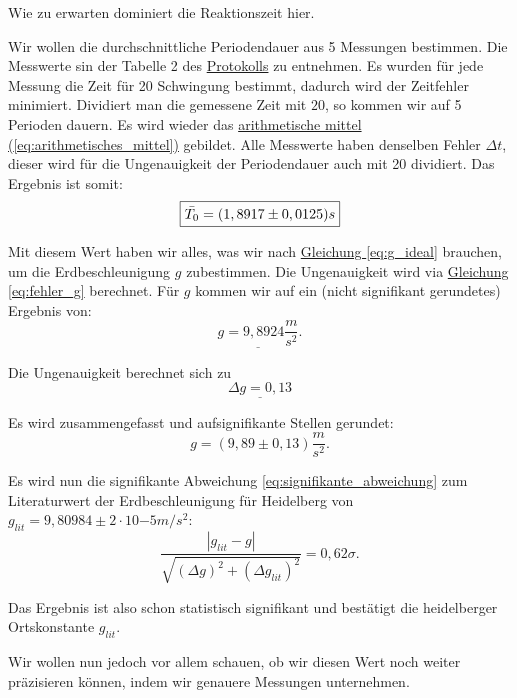 Wie zu erwarten dominiert die Reaktionszeit hier.

Wir wollen die durchschnittliche Periodendauer aus 5 Messungen bestimmen. Die Messwerte sin der Tabelle 2 des \hyperref[Protokoll]{Protokolls} zu entnehmen. Es wurden für jede Messung die Zeit für 20 Schwingung bestimmt, dadurch wird der Zeitfehler minimiert. Dividiert man die gemessene Zeit mit $20$, so kommen wir auf 5 Perioden dauern. Es wird wieder das \hyperref[eq:arithmetisches_mittel]{arithmetische mittel (\ref*{eq:arithmetisches_mittel})} gebildet. Alle Messwerte haben denselben Fehler $\Delta t$, dieser wird für die Ungenauigkeit der Periodendauer auch mit 20 dividiert. Das Ergebnis ist somit:
\begin{equation}
    \boxed{
        \Bar{T_0} = (1,8917 \pm 0,0125)s
    }
\end{equation}

Mit diesem Wert haben wir alles, was wir nach \hyperref[eq:g_ideal]{Gleichung \ref*{eq:g_ideal}} brauchen, um die Erdbeschleunigung $g$ zubestimmen. Die Ungenauigkeit wird via \hyperref[eq:fehler_g]{Gleichung \ref*{eq:fehler_g}} berechnet.
Für $g$ kommen wir auf ein (nicht signifikant gerundetes) Ergebnis von:
\begin{equation}
    \underline{
        g = 9,8924 \frac{m}{s^2}
    }.
\end{equation}

Die Ungenauigkeit berechnet sich zu
\begin{equation}
    \underline{
        \Delta g = 0,13
    }
\end{equation}


Es wird zusammengefasst und aufsignifikante Stellen gerundet:
\begin{equation}
\boxed{
    g  = ( 9,89 \pm 0,13) \frac{m}{s^2}
}.
\end{equation}

Es wird nun die signifikante Abweichung \ref{eq:signifikante_abweichung} zum Literaturwert der Erdbeschleunigung für Heidelberg von $g_{lit} = 9,80984 \pm 2 \cdot 10{-5} m/s^2$:
\begin{equation}
    \frac{\left| g_{lit} - g \right|}{\sqrt{(\Delta g)^2 + (\Delta g_{lit})^2}} = 0,62\sigma.
\end{equation}

Das Ergebnis ist also schon statistisch signifikant und bestätigt die heidelberger Ortskonstante $g_{lit}$. 

Wir wollen nun jedoch vor allem schauen, ob wir diesen Wert noch weiter präzisieren können, indem wir genauere Messungen unternehmen.


